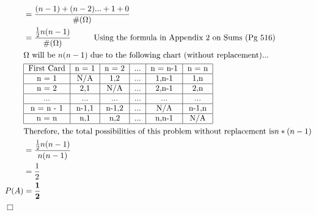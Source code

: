 \documentclass[10pt]{report}
\newenvironment{proof}{\par\noindent{\it Proof.}\hspace*{1em}}{$\Box$\bigskip}
\begin{document}
\begin{enumerate}[(a)]
\begin{enumerate}
\begin{proof}
\begin{align*}
    &= \frac{(n-1) + (n-2) ... + 1 + 0}{\#(\Omega)} \\
    & = \frac{\frac{1}{2}n(n-1)}{\#(\Omega)}   \hspace{1cm} \textnormal{Using the formula in Appendix 2 on Sums (Pg 516)}\\
    & \Omega \textnormal{ will be } n(n-1) \textnormal{ due to the following chart (without replacement)...} \\
    & \begin{tabular}{ |c|c|c|c|c|c| }
    \hline
 	\textnormal{First Card} & n = 1 & n = 2 & \textnormal{...} & n = n-1 & n = n \\ 
	 \hline
	 n = 1 & \textnormal{N/A} & 1,2 & \textnormal{...} & 1,n-1 & 1,n \\ 
	 \hline
	 n = 2 & 2,1 & \textnormal{N/A} & \textnormal{...} & 2,n-1 & 2,n \\ 
	 \hline
	 ... & ... & ... & ... & ... & ... \\ 
	 \hline
	n = n - 1 & n-1,1 & n-1,2 & \textnormal{...} & \textnormal{N/A} & n-1,n \\ 
	\hline
	n = n & n,1 & n,2 & \textnormal{...} & n,n-1 & \textnormal{N/A} \\
	\hline
     \end{tabular} \\
     & \textnormal{Therefore, the total possibilities of this problem without replacement is} n * (n-1) \\
    &=  \frac{\frac{1}{2}n(n-1)}{n(n-1)} \\
    &= \frac{1}{2} \\
      P(A) &=\mathbf{ \frac{1}{2}}
    \end{align*}
    \end{proof}
    \end{enumerate}
\end{enumerate}
\setcounter{subsection}{4}
\end{document}
